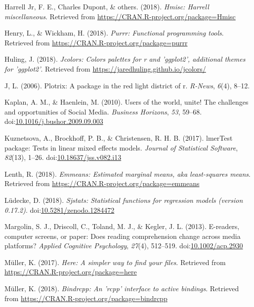 \documentclass[man, fleqn, noextraspace]{apa6}
\theoremstyle{definition}
\theoremstyle{definition}
\theoremstyle{definition}
\theoremstyle{remark}
\begin{document}
\hypertarget{ref-R-Hmisc}{}
Harrell Jr, F. E., Charles Dupont, \& others. (2018). \emph{Hmisc:
Harrell miscellaneous}. Retrieved from
\url{https://CRAN.R-project.org/package=Hmisc}

\hypertarget{ref-R-purrr}{}
Henry, L., \& Wickham, H. (2018). \emph{Purrr: Functional programming
tools}. Retrieved from \url{https://CRAN.R-project.org/package=purrr}

\hypertarget{ref-R-jcolors}{}
Huling, J. (2018). \emph{Jcolors: Colors palettes for r and 'ggplot2',
additional themes for 'ggplot2'}. Retrieved from
\url{https://jaredhuling.github.io/jcolors/}

\hypertarget{ref-R-plotrix}{}
J, L. (2006). Plotrix: A package in the red light district of r.
\emph{R-News}, \emph{6}(4), 8--12.

\hypertarget{ref-Kaplan2010}{}
Kaplan, A. M., \& Haenlein, M. (2010). Users of the world, unite! The
challenges and opportunities of Social Media. \emph{Business Horizons},
\emph{53}, 59--68.
doi:\href{https://doi.org/10.1016/j.bushor.2009.09.003}{10.1016/j.bushor.2009.09.003}

\hypertarget{ref-R-lmerTest}{}
Kuznetsova, A., Brockhoff, P. B., \& Christensen, R. H. B. (2017).
lmerTest package: Tests in linear mixed effects models. \emph{Journal of
Statistical Software}, \emph{82}(13), 1--26.
doi:\href{https://doi.org/10.18637/jss.v082.i13}{10.18637/jss.v082.i13}

\hypertarget{ref-R-emmeans}{}
Lenth, R. (2018). \emph{Emmeans: Estimated marginal means, aka
least-squares means}. Retrieved from
\url{https://CRAN.R-project.org/package=emmeans}

\hypertarget{ref-R-sjstats}{}
Lüdecke, D. (2018). \emph{Sjstats: Statistical functions for regression
models (version 0.17.2)}.
doi:\href{https://doi.org/10.5281/zenodo.1284472}{10.5281/zenodo.1284472}

\hypertarget{ref-Margolin2013}{}
Margolin, S. J., Driscoll, C., Toland, M. J., \& Kegler, J. L. (2013).
E-readers, computer screens, or paper: Does reading comprehension change
across media platforms? \emph{Applied Cognitive Psychology},
\emph{27}(4), 512--519.
doi:\href{https://doi.org/10.1002/acp.2930}{10.1002/acp.2930}

\hypertarget{ref-R-here}{}
Müller, K. (2017). \emph{Here: A simpler way to find your files}.
Retrieved from \url{https://CRAN.R-project.org/package=here}

\hypertarget{ref-R-bindrcpp}{}
Müller, K. (2018). \emph{Bindrcpp: An 'rcpp' interface to active
bindings}. Retrieved from
\url{https://CRAN.R-project.org/package=bindrcpp}
\end{document}
